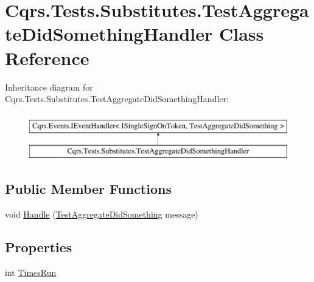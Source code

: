 \hypertarget{classCqrs_1_1Tests_1_1Substitutes_1_1TestAggregateDidSomethingHandler}{}\section{Cqrs.\+Tests.\+Substitutes.\+Test\+Aggregate\+Did\+Something\+Handler Class Reference}
\label{classCqrs_1_1Tests_1_1Substitutes_1_1TestAggregateDidSomethingHandler}
Inheritance diagram for Cqrs.\+Tests.\+Substitutes.\+Test\+Aggregate\+Did\+Something\+Handler\+:\begin{figure}[H]
\begin{center}
\leavevmode
\includegraphics[height=2.000000cm]{classCqrs_1_1Tests_1_1Substitutes_1_1TestAggregateDidSomethingHandler}
\end{center}
\end{figure}
\subsection*{Public Member Functions}
\begin{DoxyCompactItemize}
\item 
void \hyperlink{classCqrs_1_1Tests_1_1Substitutes_1_1TestAggregateDidSomethingHandler_a614df627f6424696bf8117995c9ad3fa_a614df627f6424696bf8117995c9ad3fa}{Handle} (\hyperlink{classCqrs_1_1Tests_1_1Substitutes_1_1TestAggregateDidSomething}{Test\+Aggregate\+Did\+Something} message)
\end{DoxyCompactItemize}
\subsection*{Properties}
\begin{DoxyCompactItemize}
\item 
int \hyperlink{classCqrs_1_1Tests_1_1Substitutes_1_1TestAggregateDidSomethingHandler_a8b1e5833823a488446f350db2a3ed58b_a8b1e5833823a488446f350db2a3ed58b}{Times\+Run}
\end{DoxyCompactItemize}


